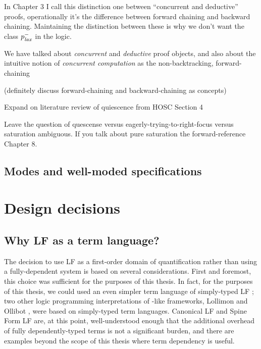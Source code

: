 In Chapter 3 I call this distinction one between ``concurrent and deductive''
proofs, operationally it's the difference between forward chaining 
and backward chaining. Maintaining the distinction between these is why
we don't want the class $p^-_{\it lax}$ in the logic.

We have talked about {\it concurrent} and {\it deductive} proof
objects, and also about the intuitive notion of {\it concurrent
  computation} as the non-backtracking, forward-chaining 

(definitely discuss forward-chaining and backward-chaining as concepts)

Expand on literature review of quiescence from HOSC Section 4

Leave the question of quescense versus eagerly-trying-to-right-focus
versus saturation ambiguous. If you talk about pure saturation the
forward-reference Chapter 8. 

\subsection{Modes and well-moded specifications}
\label{sec:framework-modes}

\section{Design decisions}

\subsection{Why LF as a term language?}
\label{sec:why-not-fully-dependent}

The decision to use LF as a first-order domain of quantification
rather than using a fully-dependent system is based on several
considerations. First and foremost, this choice was sufficient for the
purposes of this thesis. In fact, for the purposes of this thesis, we
could used an even simpler term language of simply-typed LF
\cite{pfenning08church}; two other logic programming interpretations
of \sls-like frameworks, Lollimon \cite{lopez05monadic} and Ollibot
\cite{pfenning09substructural}, were based on simply-typed term
languages. Canonical LF and Spine Form LF are, at this point,
well-understood enough that the additional overhead of fully
dependently-typed terms is not a significant burden, and there are
examples beyond the scope of this thesis where term dependency is
useful.


